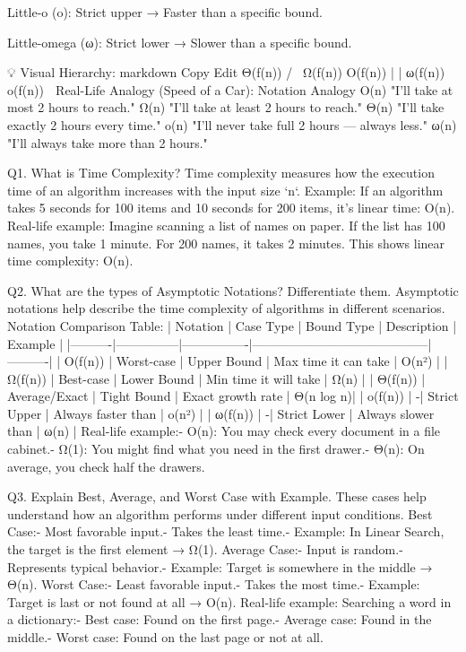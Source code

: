 Little-o (o): Strict upper → Faster than a specific bound.

Little-omega (ω): Strict lower → Slower than a specific bound.

💡 Visual Hierarchy:
markdown
Copy
Edit
                 Θ(f(n))
                /       \
             Ω(f(n))   O(f(n))
              |           |
           ω(f(n))     o(f(n))
🚀 Real-Life Analogy (Speed of a Car):
Notation	Analogy
O(n)	"I’ll take at most 2 hours to reach."
Ω(n)	"I’ll take at least 2 hours to reach."
Θ(n)	"I’ll take exactly 2 hours every time."
o(n)	"I’ll never take full 2 hours — always less."
ω(n)	"I’ll always take more than 2 hours."






Q1. What is Time Complexity?
 Time complexity measures how the execution time of an algorithm increases with the input size `n`.
 Example:
 If an algorithm takes 5 seconds for 100 items and 10 seconds for 200 items, it's linear time: O(n).
 Real-life example:
 Imagine scanning a list of names on paper. If the list has 100 names, you take 1 minute. For 200
 names, it takes 2 minutes. This shows linear time complexity: O(n).


 Q2. What are the types of Asymptotic Notations? Differentiate them.
 Asymptotic notations help describe the time complexity of algorithms in different scenarios.
 Notation Comparison Table:
 | Notation | Case Type     | Bound Type | Description | Example |
 |----------|---------------|----------------|------------------------------------------|----------|
 | O(f(n)) | Worst-case    | Upper Bound | Max time it can take | O(n²) |
 | Ω(f(n)) | Best-case     | Lower Bound | Min time it will take | Ω(n) |
 | Θ(f(n)) | Average/Exact | Tight Bound | Exact growth rate | Θ(n log n)|
 | o(f(n)) | -| Strict Upper | Always faster than | o(n²) |
 | ω(f(n)) | -| Strict Lower | Always slower than | ω(n) |
 Real-life example:- O(n): You may check every document in a file cabinet.- Ω(1): You might find what you need in the first drawer.- Θ(n): On average, you check half the drawers.


 Q3. Explain Best, Average, and Worst Case with Example.
 These cases help understand how an algorithm performs under different input conditions.
 Best Case:- Most favorable input.- Takes the least time.- Example: In Linear Search, the target is the first element → Ω(1).
 Average Case:- Input is random.- Represents typical behavior.- Example: Target is somewhere in the middle → Θ(n).
 Worst Case:- Least favorable input.- Takes the most time.- Example: Target is last or not found at all → O(n).
 Real-life example:
 Searching a word in a dictionary:- Best case: Found on the first page.- Average case: Found in the middle.- Worst case: Found on the last page or not at all.


